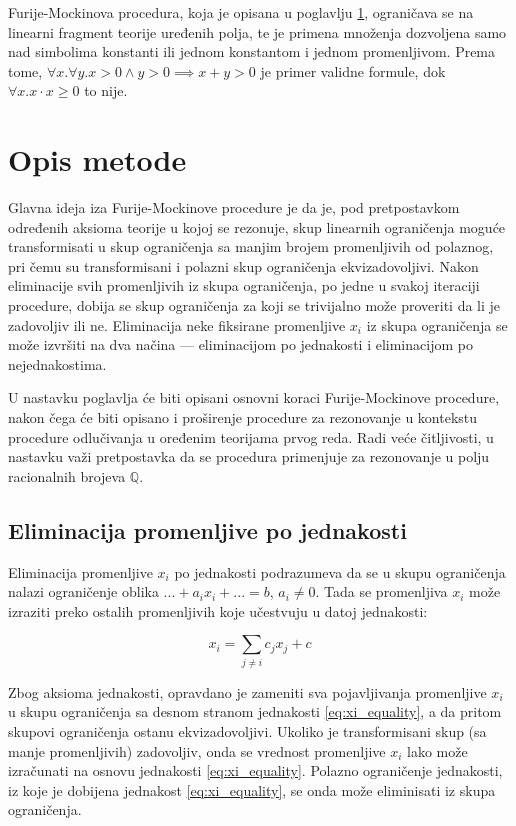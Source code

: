 \documentclass[a4paper,10pt]{article}
\begin{document}
Furije-Mockinova procedura, koja je opisana u poglavlju \ref{sec:opis_metode}, ograničava se na linearni fragment teorije uređenih polja, te je primena množenja dozvoljena samo nad simbolima konstanti ili jednom konstantom i jednom promenljivom. Prema tome, $\forall x.\forall y.x > 0 \land y > 0 \implies x + y > 0$ je primer validne formule, dok $\forall x.x \cdot x \geq 0$ to nije.

\section{Opis metode}
\label{sec:opis_metode}

Glavna ideja iza Furije-Mockinove procedure je da je, pod pretpostavkom određenih aksioma teorije u kojoj se rezonuje, skup linearnih ograničenja moguće transformisati u skup ograničenja sa manjim brojem promenljivih od polaznog, pri čemu su transformisani i polazni skup ograničenja ekvizadovoljivi. Nakon eliminacije svih promenljivih iz skupa ograničenja, po jedne u svakoj iteraciji procedure, dobija se skup ograničenja za koji se trivijalno može proveriti da li je zadovoljiv ili ne. Eliminacija neke fiksirane promenljive $x_i$ iz skupa ograničenja se može izvršiti na dva načina --- eliminacijom po jednakosti i eliminacijom po nejednakostima.

U nastavku poglavlja će biti opisani osnovni koraci Furije-Mockinove procedure, nakon čega će biti opisano i proširenje procedure za rezonovanje u kontekstu procedure odlučivanja u oređenim teorijama prvog reda. Radi veće čitljivosti, u nastavku važi pretpostavka da se procedura primenjuje za rezonovanje u polju racionalnih brojeva $\mathbb{Q}$.

\subsection{Eliminacija promenljive po jednakosti}

Eliminacija promenljive $x_i$ po jednakosti podrazumeva da se u skupu ograničenja nalazi ograničenje oblika $... + a_ix_i + ... = b$, $a_i \ne 0$. Tada se promenljiva $x_i$ može izraziti preko ostalih promenljivih koje učestvuju u datoj jednakosti:

\begin{equation}
    \label{eq:xi_equality}
    x_i = \sum_{j \ne i}{c_jx_j + c}
\end{equation}

Zbog aksioma jednakosti, opravdano je zameniti sva pojavljivanja promenljive $x_i$ u skupu ograničenja sa desnom stranom jednakosti \eqref{eq:xi_equality}, a da pritom skupovi ograničenja ostanu ekvizadovoljivi. Ukoliko je transformisani skup (sa manje promenljivih) zadovoljiv, onda se vrednost promenljive $x_i$ lako može izračunati na osnovu jednakosti \eqref{eq:xi_equality}. Polazno ograničenje jednakosti, iz koje je dobijena jednakost \eqref{eq:xi_equality}, se onda može eliminisati iz skupa ograničenja.
\end{document}
